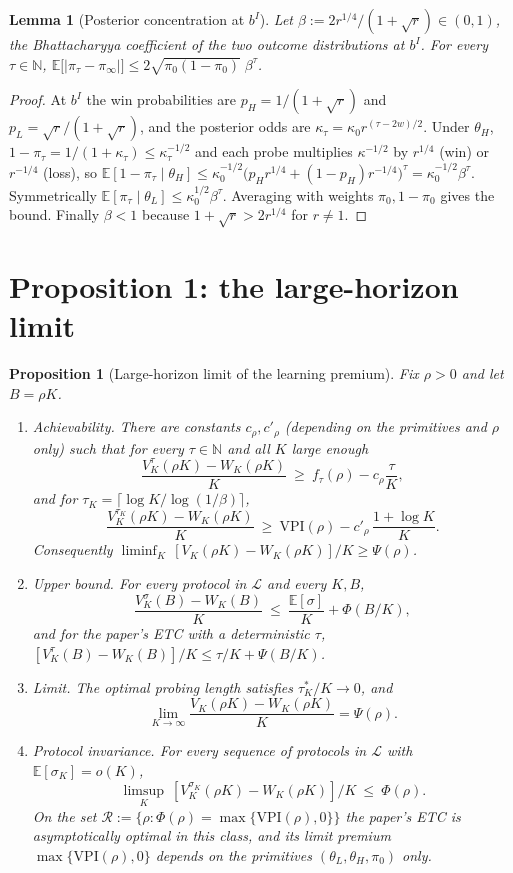 \documentclass[11pt]{article}
\newtheorem{proposition}{Proposition}
\newtheorem{lemma}{Lemma}
\theoremstyle{definition}
\theoremstyle{remark}
\newcommand{\E}{\mathbb{E}}
\newcommand{\VPI}{\mathrm{VPI}}
\newcommand{\cL}{\mathcal{L}}
\newcommand{\cR}{\mathcal{R}}
\begin{document}
\begin{lemma}[Posterior concentration at $b^I$]\label{lem:conc}
Let $\beta:=2r^{1/4}/(1+\sqrt r)\in(0,1)$, the Bhattacharyya coefficient of the two outcome distributions at
$b^I$. For every $\tau\in\mathbb N$,
$\E\bigl[|\pi_\tau-\pi_\infty|\bigr]\le 2\sqrt{\pi_0(1-\pi_0)}\;\beta^{\tau}$.
\end{lemma}

\begin{proof}
At $b^I$ the win probabilities are $p_H=1/(1+\sqrt r)$ and $p_L=\sqrt r/(1+\sqrt r)$, and the posterior odds are
$\kappa_\tau=\kappa_0r^{(\tau-2w)/2}$. Under $\theta_H$, $1-\pi_\tau=1/(1+\kappa_\tau)\le\kappa_\tau^{-1/2}$ and each
probe multiplies $\kappa^{-1/2}$ by $r^{1/4}$ (win) or $r^{-1/4}$ (loss), so
$\E[1-\pi_\tau\mid\theta_H]\le\kappa_0^{-1/2}\bigl(p_Hr^{1/4}+(1-p_H)r^{-1/4}\bigr)^{\tau}=\kappa_0^{-1/2}\beta^{\tau}$.
Symmetrically $\E[\pi_\tau\mid\theta_L]\le\kappa_0^{1/2}\beta^\tau$. Averaging with weights $\pi_0,1-\pi_0$ gives
the bound. Finally $\beta<1$ because $1+\sqrt r>2r^{1/4}$ for $r\neq1$.
\end{proof}

\section{Proposition 1: the large-horizon limit}\label{sec:prop1}

\begin{proposition}[Large-horizon limit of the learning premium]\label{prop:limit}
Fix $\rho>0$ and let $B=\rho K$.
\begin{enumerate}
\item[(a)] \emph{Achievability.} There are constants $c_\rho,c'_\rho$ (depending on the primitives and $\rho$ only)
such that for every $\tau\in\mathbb N$ and all $K$ large enough
\[
\frac{V_K^{\tau}(\rho K)-W_K(\rho K)}{K}\ \ge\ f_\tau(\rho)-c_\rho\frac{\tau}{K},
\]
and for $\tau_K=\lceil\log K/\log(1/\beta)\rceil$,
\[
\frac{V_K^{\tau_K}(\rho K)-W_K(\rho K)}{K}\ \ge\ \VPI(\rho)-c'_\rho\,\frac{1+\log K}{K}.
\]
Consequently $\liminf_{K}\,[V_K(\rho K)-W_K(\rho K)]/K\ge\Psi(\rho)$.
\item[(b)] \emph{Upper bound.} For every protocol in $\cL$ and every $K,B$,
\[
\frac{V^{\sigma}_K(B)-W_K(B)}{K}\ \le\ \frac{\E[\sigma]}{K}+\Phi(B/K),
\]
and for the paper's ETC with a deterministic $\tau$, $[V^{\tau}_K(B)-W_K(B)]/K\le\tau/K+\Psi(B/K)$.
\item[(c)] \emph{Limit.} The optimal probing length satisfies $\tau^*_K/K\to0$, and
\[
\lim_{K\to\infty}\frac{V_K(\rho K)-W_K(\rho K)}{K}=\Psi(\rho).
\]
\item[(d)] \emph{Protocol invariance.} For every sequence of protocols in $\cL$ with $\E[\sigma_K]=o(K)$,
\[
\limsup_K\ [V^{\sigma_K}_K(\rho K)-W_K(\rho K)]/K\ \le\ \Phi(\rho).
\] On the set
$\cR:=\{\rho:\Phi(\rho)=\max\{\VPI(\rho),0\}\}$ the paper's ETC is asymptotically optimal in this class, and its
limit premium $\max\{\VPI(\rho),0\}$ depends on the primitives $(\theta_L,\theta_H,\pi_0)$ only.
\end{enumerate}
\end{proposition}
\end{document}
